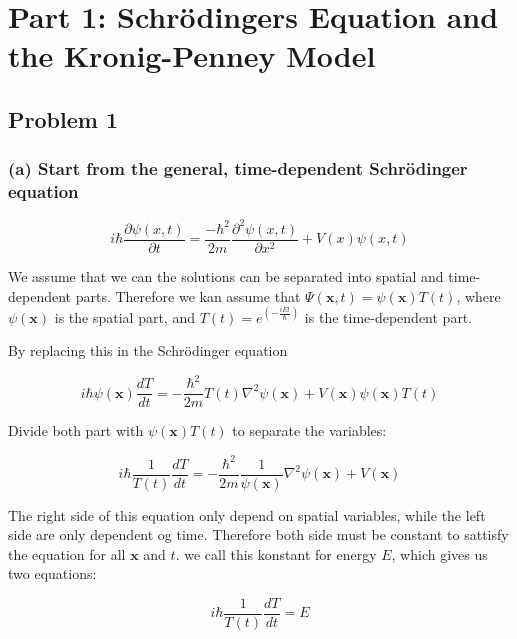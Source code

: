 \section{Part 1: Schrödingers Equation and the Kronig-Penney Model}

\subsection*{Problem 1}

\subsubsection*{(a) Start from the general, time-dependent Schrödinger equation}

\begin{equation*}
    i \hbar \frac{\partial \psi(x, t)}{\partial t}=\frac{-\hbar^{2}}{2 m} \frac{\partial^{2} \psi(x, t)}{\partial x^{2}}+V(x) \psi(x, t)
\end{equation*}

We assume that we can the solutions can be separated into spatial and time-dependent parts. Therefore we kan assume that $\Psi(\mathbf{x},t) = \psi(\mathbf{x})T(t)$, where $\psi(\mathbf{x})$ is the spatial part, and $T(t)=e^(-\frac{iEt}{\hbar})$ is the time-dependent part.

By replacing this in the Schrödinger equation

\begin{equation*}
    i\hbar \psi(\mathbf{x})\frac{dT}{dt} = -\frac{\hbar^2}{2m}T(t)\nabla^2\psi(\mathbf{x}) + V(\mathbf{x})\psi(\mathbf{x})T(t)
\end{equation*}

Divide both part with $\psi(\mathbf{x})T(t)$ to separate the variables:

\begin{equation*}
    i\hbar\frac{1}{T(t)}\frac{dT}{dt} = -\frac{\hbar^2}{2m}\frac{1}{\psi(\mathbf{x})}\nabla^2\psi(\mathbf{x}) + V(\mathbf{x})
\end{equation*}

The right side of this equation only depend on spatial variables, while the left side are only dependent og time. Therefore both side must be constant to sattisfy the equation for all $\mathbf{x}$ and $t$. we call this konstant for energy $E$, which gives us two equations:
    
\begin{equation*}
    i\hbar\frac{1}{T(t)}\frac{dT}{dt} = E
\end{equation*}
    
